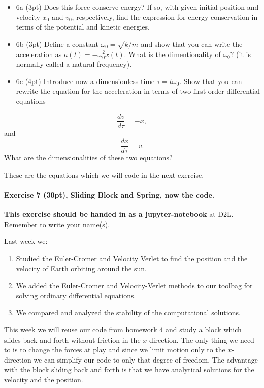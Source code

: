 \documentclass[%
oneside,                 %
final,                   %
10pt]{article}
\begin{document}
\begin{itemize}
\item 6a (3pt) Does this force conserve energy? If so, with given initial position and velocity $x_0$ and $v_0$, respectively, find the expression for energy conservation in terms of the potential and kinetic energies.  

\item 6b (3pt) Define a constant $\omega_0=\sqrt{k/m}$ and show that you can write the acceleration as $a(t) = -\omega_0^2 x(t)$. What is the dimentionality of $\omega_0$? (it is normally called a natural frequency).  

\item 6c (4pt) Introduce now a dimensionless time $\tau = t\omega_0$. Show that you can rewrite the  equation for the acceleration in terms of two first-order differential equations
\end{itemize}

\noindent
\[
\frac{dv}{d\tau} = -x,
\]
and
\[
\frac{dx}{d\tau} = v.
\]
What are the dimensionalities of these two equations?

These are the equations which we will code in the next exercise.

\paragraph{Exercise 7 (30pt), Sliding Block  and Spring, now the code.}
\textbf{This exercise should be handed in as a jupyter-notebook} at D2L. Remember to write your name(s). 

Last week we:
\begin{enumerate}
\item Studied  the Euler-Cromer and Velocity Verlet  to find the position and the velocity of  Earth orbiting around the sun.

\item We added the Euler-Cromer and Velocity-Verlet methods to our toolbag for solving ordinary differential equations.

\item We compared and analyzed the stability of the  computational solutions.
\end{enumerate}

\noindent
This week we will reuse our code from homework 4 and study a block
which slides back and forth without friction in the $x$-direction.
The only thing we need to is to change the forces at play and since we
limit motion only to the $x$-direction we can simplify our code to
only that degree of freedom.
The advantage with the block sliding back and forth is that we have analytical solutions for the velocity and the position. 
\end{document}
